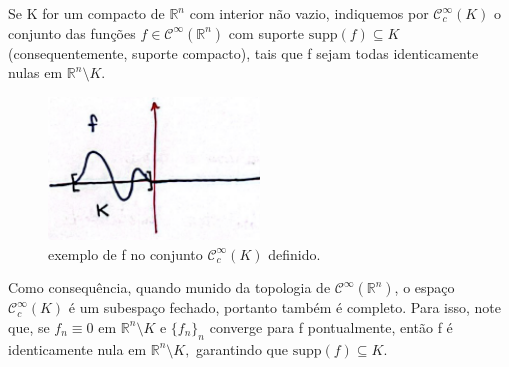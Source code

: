 \documentclass[../distribution_theory_notes.tex]{subfiles}
\begin{document}
\begin{example}
	Se K for um compacto de \(\mathbb{R}^{n}\) com interior não vazio, indiquemos por \(\mathcal{C}_{c}^{\infty}(K)\) o conjunto das funções \(f\in \mathcal{C}^{\infty}(\mathbb{R}^{n})\) com suporte \(\mathrm{supp}(f)\subseteq K\) (consequentemente, suporte compacto), tais que f sejam todas identicamente nulas em \(\mathbb{R}^{n}\setminus{K}.\)
	\begin{figure}[H]
		\begin{center}
			\includegraphics[height=0.5\textheight, width=0.5\textwidth, keepaspectratio]{./Images/compact_support_04.png}
		\end{center}
		\caption{exemplo de f no conjunto \(\mathcal{C}_{c}^{\infty}(K)\) definido.}
	\end{figure}

	Como consequência, quando munido da topologia de \(\mathcal{C}^{\infty}(\mathbb{R}^{n})\), o espaço \(\mathcal{C}_{c}^{\infty}(K)\) é um subespaço fechado, portanto também é completo. Para isso, note que, se \(f_{n}\equiv 0\) em \(\mathbb{R}^{n}\setminus{K}\) e \(\{f_{n}\}_{n}\) converge para f pontualmente, então f é identicamente nula em \(\mathbb{R}^{n}\setminus{K},\) garantindo que \(\mathrm{supp}(f)\subseteq K.\)
\end{example}
\end{document}
